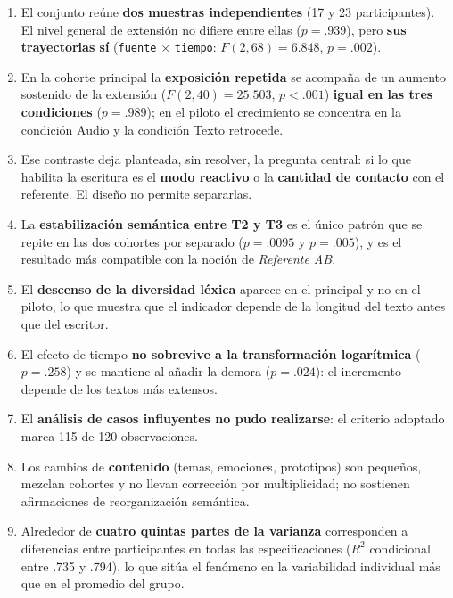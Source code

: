 \documentclass[12pt]{article}
\begin{document}
\begin{enumerate}
	\item El conjunto reúne \textbf{dos muestras independientes} (17 y 23 participantes). El nivel
	general de extensión no difiere entre ellas ($p = .939$), pero \textbf{sus trayectorias sí}
	(\texttt{fuente} $\times$ \texttt{tiempo}: $F(2,68) = 6.848$, $p = .002$).
	\item En la cohorte principal la \textbf{exposición repetida} se acompaña de un aumento
	sostenido de la extensión ($F(2,40) = 25.503$, $p < .001$) \textbf{igual en las tres
	condiciones} ($p = .989$); en el piloto el crecimiento se concentra en la condición Audio y
	la condición Texto retrocede.
	\item Ese contraste deja planteada, sin resolver, la pregunta central: si lo que habilita la
	escritura es el \textbf{modo reactivo} o la \textbf{cantidad de contacto} con el referente.
	El diseño no permite separarlas.
	\item La \textbf{estabilización semántica entre T2 y T3} es el único patrón que se repite en
	las dos cohortes por separado ($p = .0095$ y $p = .005$), y es el resultado más compatible
	con la noción de \emph{Referente AB}.
	\item El \textbf{descenso de la diversidad léxica} aparece en el principal y no en el piloto,
	lo que muestra que el indicador depende de la longitud del texto antes que del escritor.
	\item El efecto de tiempo \textbf{no sobrevive a la transformación logarítmica}
	($p = .258$) y se mantiene al añadir la demora ($p = .024$): el incremento depende de los
	textos más extensos.
	\item El \textbf{análisis de casos influyentes no pudo realizarse}: el criterio adoptado marca
	115 de 120 observaciones.
	\item Los cambios de \textbf{contenido} (temas, emociones, prototipos) son pequeños, mezclan
	cohortes y no llevan corrección por multiplicidad; no sostienen afirmaciones de
	reorganización semántica.
	\item Alrededor de \textbf{cuatro quintas partes de la varianza} corresponden a diferencias
	entre participantes en todas las especificaciones ($R^2$ condicional entre .735 y .794), lo
	que sitúa el fenómeno en la variabilidad individual más que en el promedio del grupo.
\end{enumerate}
\end{document}
